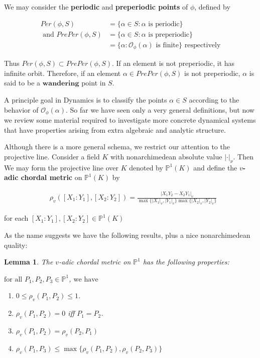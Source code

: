 \documentclass[12pt]{amsart}
\newtheorem{lem}[thm]{Lemma}
\theoremstyle{definition}
\theoremstyle{remark}
\theoremstyle{definition}
\newcommand{\sbs}{\subset}
\renewcommand{\P}{\mathbb{P}}
\begin{document}
We may consider the \textbf{periodic} and  \textbf{preperiodic points} of $\phi$, defined by 

\begin{align*}
Per(\phi,S) 
&= \{\alpha \in S: \alpha \text{ is periodic}\} \\ \text{ and }PrePer(\phi,S) 
&= \{\alpha \in S: \alpha \text{ is preperiodic}\} \\ 
& = \{\alpha:\mathcal{O}_{\phi}(\alpha) \text{ is finite}\}  \text{ respectively}
\end{align*}

Thus $Per(\phi,S) \sbs PrePer(\phi,S)$. If an element is not preperiodic, it has infinite orbit. Therefore, if an element $\alpha \in PrePer(\phi,S)$ is not preperiodic, $\alpha$  is said to be a $\textbf{wandering}$ point in $S$.

A principle goal in Dynamics is to classify the points $\alpha \in S$ according to the behavior of $\mathcal{O}_\phi(\alpha)$. So far we have seen only a very general definitions, but now we review some material required to investigate more concrete dynamical systems that have properties arising from extra algebraic and analytic structure. 

Although there is a more general schema, we restrict our attention to the projective line. Consider a field $K$ with nonarchimedean absolute value $|\cdot|_{\nu}$. Then We may form the projective line over $K$ denoted by $\P^{1}(K)$ and define the {\boldmath$v$}\textbf{-adic chordal metric} on $\P^{1}(K)$ by 

\begin{align*}
&\rho_{v}([X_{1}:Y_{1}],[X_{2}:Y_{2}]) = \frac{|X_{1}Y_{2} - X_{2}Y_{1}|_{v}}{\max\{|X_{1}|_{v},|Y_{1}|_{v}\}\max\{|X_{2}|_{v},|Y_{2}|_{v}\}} 
\end{align*} 

\noindent for each $[X_{1}: Y_{1}],[X_{2}: Y_{2}] \in \P^{1}(K)$


As the name suggests we have the following results, plus a nice nonarchimedean quality:

\begin{lem}
The $v$-adic chordal metric on $\P^{1}$ has the following properties: 

$\text{for all }P_{1}, P_{2}, P_{3} \in \P^{1}$, $\text{we have}$

\begin{enumerate}
\item $ 0 \leq \rho_{v}(P_{1},P_{2}) \leq 1$.  
\item $\rho_{v}(P_{1},P_{2}) = 0$ iff $P_{1} = P_2$.
\item $\rho_{v}(P_{1},P_{2}) = \rho_{v}(P_{2},P_{1})$
\item $\rho_{v}(P_{1},P_{3}) \leq \max\{\rho_{v}(P_{1},P_{2}), \rho_{v}(P_{2},P_{3})\}$
\end{enumerate}

\end{lem}
\end{document}
